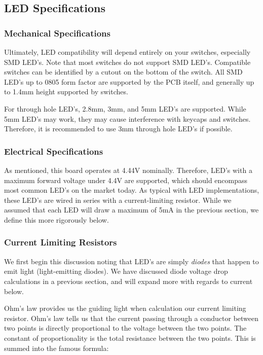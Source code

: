 \documentclass[11pt]{article}
\begin{document}
\subsection{LED Specifications}

\subsubsection{Mechanical Specifications}

Ultimately, LED compatibility will depend entirely on your switches, especially SMD LED's. Note that most switches do not support SMD LED's. Compatible switches can be identified by a cutout on the bottom of the switch. All SMD LED's up to 0805 form factor are supported by the PCB itself, and generally up to 1.4mm height supported by switches.

For through hole LED's, 2.8mm, 3mm, and 5mm LED's are supported. While 5mm LED's may work, they may cause interference with keycaps and switches. Therefore, it is recommended to use 3mm through hole LED's if possible.

\subsubsection{Electrical Specifications}

As mentioned, this board operates at 4.44V nominally.\footnotemark {} Therefore, LED's with a maximum forward voltage under 4.4V are supported, which should encompass most common LED's on the market today. As typical with LED implementations, these LED's are wired in series with a current-limiting resistor. While we assumed that each LED will draw a maximum of 5mA in the previous section, we define this more rigorously below.

\subsubsection{Current Limiting Resistors}

We first begin this discussion noting that LED's are simply \emph{diodes} that happen to emit light (light-emitting diodes). We have discussed diode voltage drop calculations in a previous section,\footnotemark {} and will expand more with regards to current below.

Ohm's law provides us the guiding light when calculation our current limiting resistor. Ohm's law tells us that the current passing through a conductor between two points is directly proportional to the voltage between the two points. The constant of proportionality is the total resistance between the two points. This is summed into the famous formula:
\end{document}

